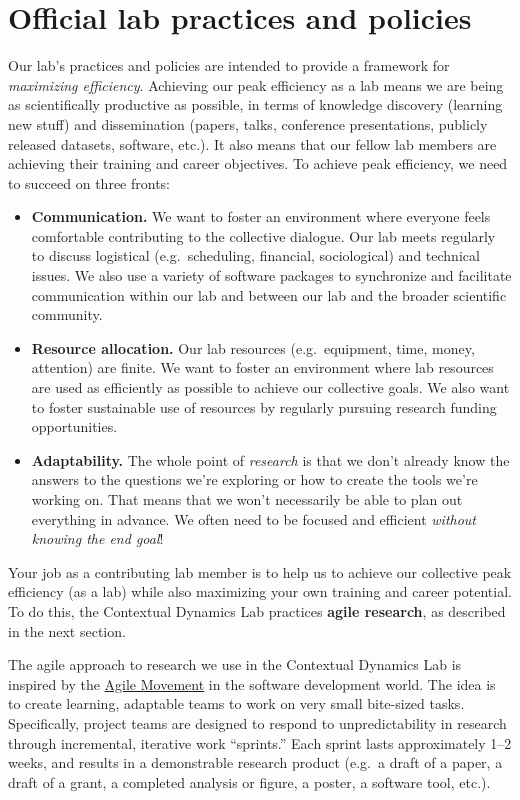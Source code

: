 \documentclass{tufte-book} %
\begin{document}
\chapter{Official lab practices and policies}\label{ch:policy}
Our lab's practices and policies are intended to provide a framework
for \textit{maximizing efficiency}.  Achieving our peak efficiency as
a lab means we are being as scientifically productive as possible, in
terms of knowledge discovery (learning new stuff) and dissemination
(papers, talks, conference presentations, publicly released datasets,
software, etc.). It also means that our fellow lab members are
achieving their training and career objectives.  To achieve peak
efficiency, we need to succeed on three fronts:
\begin{itemize}
\item \textbf{Communication.}  We want to foster an environment where
  everyone feels comfortable contributing to the collective dialogue.
  Our lab meets regularly to discuss logistical (e.g.\ scheduling, financial,
  sociological) and technical issues.  We also use a variety of
  software packages to synchronize and facilitate communication within
  our lab and between our lab and the broader scientific community.
\item \textbf{Resource allocation.}  Our lab resources (e.g.\
  equipment, time, money, attention) are finite.  We want to foster an
  environment where lab resources are used as efficiently as possible
  to achieve our collective goals.  We also want to foster
  sustainable use of resources by regularly pursuing research funding opportunities.
\item \textbf{Adaptability.}  The whole point of \textit{research} is that we
  don't already know the answers to the questions we're exploring or
  how to create the tools we're working on.  That means that we won't
  necessarily be able to plan out everything in advance.  We often need to
  be focused and efficient \textit{without knowing the end goal}!
\end{itemize}
Your job as a contributing lab member is to help us to achieve our
collective peak efficiency (as a lab) while also maximizing your own
training and career potential.  To do this, the Contextual Dynamics
Lab practices \textbf{agile research}, as described in the next section.

{}

\noindent The agile approach to research we use in the Contextual Dynamics Lab
is inspired by the \href{http://scrumtrainingseries.com/}{Agile
  Movement} in the software development world.  The idea is to create
learning, adaptable teams to work on very small bite-sized tasks.
Specifically, project teams are designed to respond to
unpredictability in research through incremental, iterative work
``sprints.''  Each sprint lasts approximately 1--2 weeks, and results
in a demonstrable research product (e.g.\ a draft of a paper, a draft
of a grant, a completed analysis or figure, a poster, a software tool,
etc.).
\end{document}
